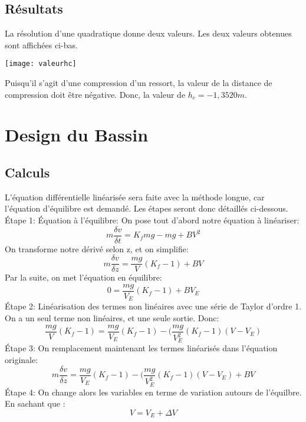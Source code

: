 \documentclass[12pt]{article}
\begin{document}
\subsection{Résultats}
La résolution d'une quadratique donne deux valeurs. Les deux valeurs obtenues sont affichées ci-bas.
\begin{center}
	\texttt{[image: valeurhc]}
\end{center}
Puisqu'il s'agit d'une compression d'un ressort, la valeur de la distance de compression doit être négative. Donc, la valeur de $h_c = -1,3520m$.
\section{Design du Bassin}
\subsection{Calculs}
L'équation différentielle linéarisée sera faite avec la méthode longue, car l'équation d'équilibre est demandé. Les étapes seront donc détaillés ci-dessous.
\newline
\newline
Étape 1: Équation à l'équilibre: On pose tout d'abord notre équation à linéariser: 
\begin{equation}
m\frac{\delta v}{\delta t} = K_fmg-mg+BV^2
\end{equation}
On transforme notre dérivé selon z, et on simplifie:  
\begin{equation}
m\frac{\delta v}{\delta z} = \frac{mg}{V}(K_f-1)+BV
\end{equation}
Par la suite, on met l'équation en équilibre:
\begin{equation}
0 = \frac{mg}{V_E}(K_f-1)+BV_E
\end{equation}
Étape 2: Linéarisation des termes non linéaires avec une série de Taylor d'ordre 1. On a un seul terme non linéaires, et une seule sortie. Donc:
\begin{equation}
\frac{mg}{V}(K_f-1) = \frac{mg}{V_E}(K_f-1) - (\frac{mg}{V_E^2}(K_f-1)(V-V_E)
\end{equation}
Étape 3: On remplacement maintenant les termes linéarisés dans l'équation originale:
\begin{equation}
m\frac{\delta v}{\delta z} = \frac{mg}{V_E}(K_f-1) - (\frac{mg}{V_E^2}(K_f-1)(V-V_E)+BV
\end{equation}
Étape 4: On change alors les variables en terme de variation autours de l'équilbre. En sachant que :
\begin{equation}
V= V_E + \Delta V
\end{equation}
\end{document}
